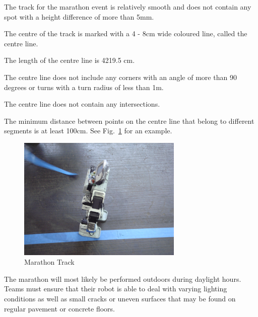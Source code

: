 \documentclass[12pt]{hurocup}
\begin{document}
\begin{lawlist}[MR]

\item The track for the marathon event is relatively smooth and does
  not contain any spot with a height difference of more than 5mm.

\item The centre of the track is marked with a 4 - 8cm wide coloured
line, called the centre line.

\item The length of the centre line is 4219.5 cm.

\item The centre line does not include any corners with an
 angle of more than 90 degrees or turns with a turn radius of less
 than 1m.

\item The centre line does not contain any intersections.

\item The minimum distance between points on the centre line that
 belong to different segments is at least 100cm.  See
 Fig.~\ref{fig:marathon-track} for an example.

\begin{figure}
  \begin{center}
    \includegraphics[width=0.7\textwidth]{Figures/marathon-track}
  \end{center}
  \caption{Marathon Track}
  \label{fig:marathon-track}
\end{figure}

\end{lawlist}

\begin{decisions}

\item The marathon will most likely be performed outdoors during
  daylight hours. Teams must ensure that their robot is able to deal
  with varying lighting conditions as well as small cracks or uneven
  surfaces that may be found on regular pavement or concrete floors.

\end{decisions}
\end{document}
